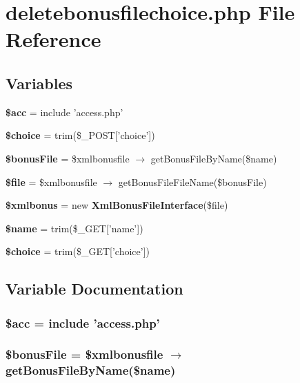 \section{deletebonusfilechoice.php File Reference}
\label{deletebonusfilechoice_8php}


\subsection*{Variables}
\begin{CompactItemize}
\item 
{\bf \$acc} = include 'access.php'
\item 
{\bf \$choice} = trim(\$\_\-POST['choice'])
\item 
{\bf \$bonus\-File} = \$xmlbonusfile $\rightarrow$ get\-Bonus\-File\-By\-Name(\$name)
\item 
{\bf \$file} = \$xmlbonusfile $\rightarrow$ get\-Bonus\-File\-File\-Name(\$bonus\-File)
\item 
{\bf \$xmlbonus} = new {\bf Xml\-Bonus\-File\-Interface}(\$file)
\item 
{\bf \$name} = trim(\$\_\-GET['name'])
\item 
{\bf \$choice} = trim(\$\_\-GET['choice'])
\end{CompactItemize}


\subsection{Variable Documentation}
\subsubsection{\setlength{\rightskip}{0pt plus 5cm}\$acc = include 'access.php'}\label{deletebonusfilechoice_8php_542926c588a05eb69553d79c83cf73da}


\subsubsection{\setlength{\rightskip}{0pt plus 5cm}\$bonus\-File = \$xmlbonusfile $\rightarrow$ get\-Bonus\-File\-By\-Name(\$name)}\label{deletebonusfilechoice_8php_6031931b24e474b9c8829866a2fdc6f6}


